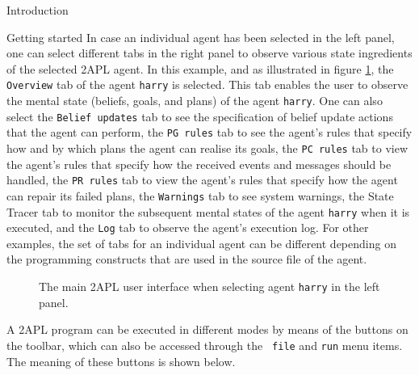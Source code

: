 \begin{chapter}{Introduction}
\begin{section}{Getting started}
In case an individual agent has been selected in the left panel, one
can select different tabs in the right panel to observe various
state ingredients of the selected 2APL agent. In this example, and
as illustrated in figure \ref{fig:harry}, the {\tt Overview} tab of
the agent {\tt harry} is selected. This tab enables the user to
observe the mental state (beliefs, goals, and plans) of the agent
{\tt harry}. One can also select the {\tt Belief updates} tab to see
the specification of belief update actions that the agent can
perform, the {\tt PG rules} tab to see the agent's rules that
specify how and by which plans the agent can realise its goals, the
{\tt PC rules} tab to view the agent's rules that specify how the
received events and messages should be handled, the {\tt PR rules}
tab to view the agent's rules that specify how the agent can repair
its failed plans, the {\tt Warnings} tab to see system warnings, the
{State Tracer} tab to monitor the subsequent mental states of the
agent {\tt harry} when it is executed, and the {\tt Log} tab to
observe the agent's execution log. For other examples, the set of
tabs for an individual agent can be different depending on the
programming constructs that are used in the source file of the
agent.

    \begin{figure}
        \begin{center}
            \caption{The main 2APL user interface when selecting agent {\tt harry} in the left panel.}\label{fig:harry}
        \end{center}
    \end{figure}

A 2APL program can be executed in different modes by means of the
buttons on the toolbar, which can also be accessed through the {\tt
file} and {\tt run} menu items. The meaning of these buttons is
shown below.


\end{section}
\end{chapter}
